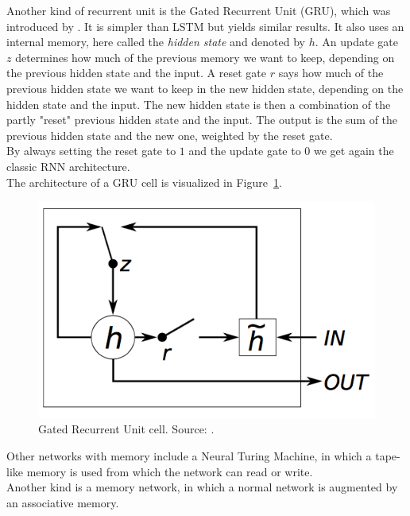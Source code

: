 Another kind of recurrent unit is the Gated Recurrent Unit (GRU), which was introduced by \cite{Cho2014LearningTranslation}. It is simpler than LSTM but yields similar results.
It also uses an internal memory, here called the \textit{hidden state} and denoted by $h$.
An update gate $z$ determines how much of the previous memory we want to keep, depending on the previous hidden state and the input.
A reset gate $r$ says how much of the previous hidden state we want to keep in the new hidden state, depending on the hidden state and the input.
The new hidden state is then a combination of the partly "reset" previous hidden state and the input.
The output is the sum of the previous hidden state and the new one, weighted by the reset gate.\\
By always setting the reset gate to $1$ and the update gate to $0$ we get again the classic RNN architecture.\\
The architecture of a GRU cell is visualized in Figure~\ref{fig:gru}.\\
\begin{figure}[htb]
    \centering
    \includegraphics[width=0.6\linewidth]{images/gru.png}
    \caption[Gated Recurrent Unit cell]{Gated Recurrent Unit cell. Source: \cite{journals/corr/ChungGCB14}.}
    \label{fig:gru}
\end{figure}

Other networks with memory include a Neural Turing Machine, in which a tape-like memory is used from which the network can read or write.\\
Another kind is a memory network, in which a normal network is augmented by an associative memory.\\
